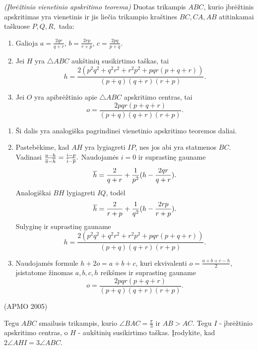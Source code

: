 \documentclass[11pt,a4paper,twoside]{book}
\begin{document}
\begin{thmnr} \textit{(Įbrėžtinio vienetinio apskritimo teorema)} Duotas trikampis $ABC$, kurio įbrėžtinis apskritimas yra vienetinis ir jis liečia trikampio kraštines $BC, CA, AB$ atitinkamai taškuose $P, Q, R,$ tada:
\begin{enumerate}
\item Galioja $a=\frac{2qr}{q+r}$, $b=\frac{2rp}{r+p}$, $c=\frac{2pq}{p+q}$.
\item Jei $H$ yra $\bigtriangleup ABC$ aukštinių susikirtimo taškas, tai
$$h=\frac{2(p^2q^2 + q^2r^2 + r^2p^2 + pqr(p + q+ r))}{(p+q)(q+r)(r+p)}.$$
\item Jei $O$ yra apibrėžtinio apie  $\bigtriangleup ABC$ apskritimo centras, tai
$$o=\frac{2pqr(p+q+r)}{(p+q)(q+r)(r+p)}.$$
\end{enumerate}
\end{thmnr}

\begin{sprendimas}
\begin{enumerate}
\item Ši dalis yra analogiška pagrindinei vienetinio apskritimo teoremos daliai.
\item Pastebėkime, kad $AH$ yra lygiagreti $IP$, nes jos abi yra statmenos $BC$. Vadinasi $\frac{a-h}{\overline a-\overline h}=\frac{i-p}{\overline i-\overline p}.$ Naudojamės $i=0$ ir suprastinę gauname $$\overline {h}= \frac{2}{q+r} + \frac{1}{p^2}(h-\frac{2qr}{q+r}).$$ Analogiškai $BH$ lygiagreti $IQ$, todėl $$\overline {h}= \frac{2}{r+p} + \frac{1}{q^2}(h-\frac{2rp}{r+p}).$$
Sulyginę ir suprastinę gauname $$h=\frac{2(p^2q^2 + q^2r^2 + r^2p^2 + pqr(p + q+ r))}{(p+q)(q+r)(r+p)}.$$
\item Naudojamės formule $h+2o=a+b+c$, kuri ekvivalenti $o=\frac{a+b+c-h}{2},$ įsistatome žinomas $a, b, c, h$ reikšmes ir suprastinę gauname
$$o=\frac{2pqr(p+q+r)}{(p+q)(q+r)(r+p)}.$$
\end{enumerate}
\end{sprendimas}






\begin{pavnr}
(APMO 2005)

Tegu $ABC$ smailusis trikampis, kurio $\angle BAC = \frac{\pi}{3}$ ir $AB>AC$. Tegu $I$ - įbrėžtinio apskritimo centras, o $H$ - aukštinių susikirtimo taškas. Įrodykite, kad $2\angle AHI=3\angle ABC$.
\end{pavnr}
\end{document}
